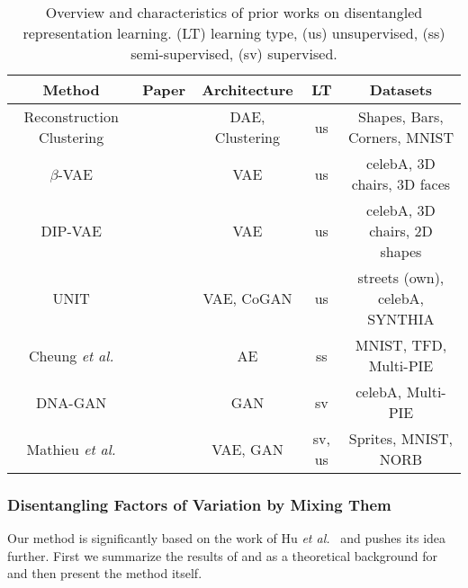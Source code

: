 \documentclass[12pt,a4paper]{article}
\begin{document}
\begin{table} [H]
\centering
\begin{tabular}{|c|c|c|c|c|}
\hline
\textbf{Method} & \textbf{Paper} & \textbf{Architecture} & \textbf{LT} & \textbf{Datasets}\\
\hline
Reconstruction Clustering & \cite{BindingRC} & DAE, Clustering & us & Shapes, Bars, Corners, MNIST \\
\hline
$\beta$-VAE & \cite{betaVAE} & VAE & us & celebA, 3D chairs, 3D faces \\
\hline
DIP-VAE & \cite{DIPVAE} & VAE &  us & celebA, 3D chairs, 2D shapes \\
\hline
UNIT & \cite{UNIT} & VAE, CoGAN & us & streets (own), celebA, SYNTHIA \\
\hline
Cheung \textit{et al.} & \cite{DiscHiddenFoViDN} & AE & ss & MNIST, TFD, Multi-PIE \\
\hline
DNA-GAN & \cite{DnaGan} & GAN & sv & celebA, Multi-PIE \\
\hline
Mathieu \textit{et al.} & \cite{1611.03383} & VAE, GAN & sv, us & Sprites, MNIST, NORB \\
\hline
\end{tabular}
\caption{Overview and characteristics of prior works on disentangled representation learning. (LT) learning type, (us) unsupervised, (ss) semi-supervised, (sv) supervised.} \label{tab:priorWorks}
\end{table}



\subsubsection{Disentangling Factors of Variation by Mixing Them}
Our method is significantly based on the work of Hu \textit{et al.}~\cite{DisentFacOfVarByMixTh} and pushes its idea further. First we summarize the results of \cite{ChallengInDisentIFoF} and \cite{UnderstDegenAndAmbInAT} as a theoretical background for \cite{DisentFacOfVarByMixTh} and then present the method itself. 
\end{document}

